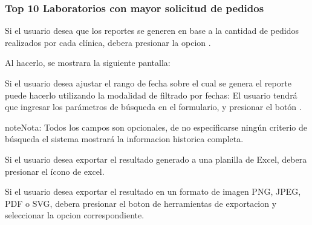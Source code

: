 \documentclass[a4paper,10pt,spanish]{sphinxmanual}
\begin{document}
\subsubsection{Top 10 Laboratorios con mayor solicitud de pedidos}
\label{pedidosalab:top-10-laboratorios-con-mayor-solicitud-de-pedidos}\label{pedidosalab:top10-peds-pl}
Si el usuario desea que los reportes se generen en base a la cantidad de pedidos realizados por cada clínica, debera presionar la opcion .


Al hacerlo, se mostrara la siguiente pantalla:


Si el usuario desea ajustar el rango de fecha sobre el cual se genera el reporte puede hacerlo utilizando la modalidad de filtrado por fechas:
El usuario tendrá que ingresar los parámetros de búsqueda en el formulario, y presionar el botón .

\begin{notice}{note}{Nota:}
Todos los campos son opcionales, de no especificarse ningún criterio de búsqueda el sistema mostrará la informacion historica completa.
\end{notice}


Si el usuario desea exportar el resultado generado a una planilla de Excel, debera presionar el ícono de excel.


Si el usuario desea exportar el resultado en un formato de imagen PNG, JPEG, PDF o SVG, debera presionar el boton de herramientas de exportacion y seleccionar la opcion correspondiente.

\end{document}
